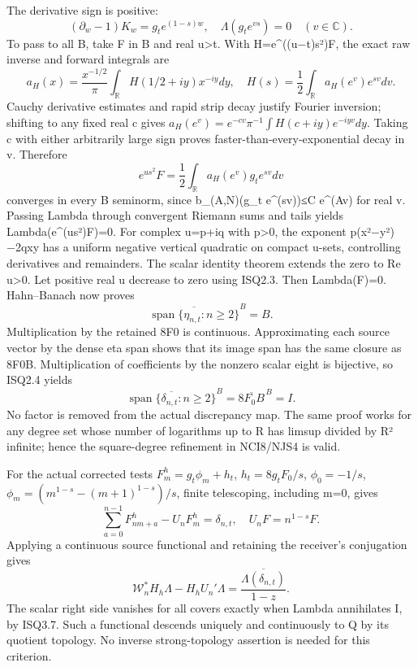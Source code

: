 \documentclass[
]{article}
\begin{document}
The derivative sign is positive: \[
(\partial_w-1)K_w=g_t e^{(1-s)w},
\quad\Lambda(g_t e^{vs})=0\quad(v\in\mathbb C).
\tag{ISQ3.3}
\] To pass to all B, take F in B and real u\textgreater t. With H=e\^{}((u−t)s²)F, the exact raw inverse and forward integrals are \[
a_H(x)=\frac{x^{-1/2}}\pi\int_\mathbb R H(1/2+iy)x^{-iy}dy,
\quad H(s)=\frac12\int_\mathbb R a_H(e^v)e^{sv}dv.
\tag{ISQ3.4}
\] Cauchy derivative estimates and rapid strip decay justify Fourier inversion; shifting to any fixed real c gives \(a_H(e^v)=e^{-cv}\pi^{-1}\int H(c+iy)e^{-iyv}dy\). Taking c with either arbitrarily large sign proves faster-than-every-exponential decay in \textbar v\textbar. Therefore \[
e^{us^2}F=\frac12\int_\mathbb R a_H(e^v)g_t e^{sv}dv
\tag{ISQ3.5}
\] converges in every B seminorm, since b\_(A,N)(g\_t e\^{}(sv))≤C e\^{}(A\textbar v\textbar) for real v. Passing Lambda through convergent Riemann sums and tails yields Lambda(e\^{}(us²)F)=0. For complex u=p+iq with p\textgreater0, the exponent p(x²−y²)−2qxy has a uniform negative vertical quadratic on compact u-sets, controlling derivatives and remainders. The scalar identity theorem extends the zero to Re u\textgreater0. Let positive real u decrease to zero using ISQ2.3. Then Lambda(F)=0. Hahn--Banach now proves \[
\overline{\operatorname{span}\{\eta_{n,t}:n\ge2\}}^B=B.
\tag{ISQ3.6}
\] Multiplication by the retained 8F0 is continuous. Approximating each source vector by the dense eta span shows that its image span has the same closure as 8F0B. Multiplication of coefficients by the nonzero scalar eight is bijective, so ISQ2.4 yields \[
\overline{\operatorname{span}\{\delta_{n,t}:n\ge2\}}^B
=\overline{8F_0B}^{\,B}=I.
\tag{ISQ3.7}
\] No factor is removed from the actual discrepancy map. The same proof works for any degree set whose number of logarithms up to R has limsup divided by R² infinite; hence the square-degree refinement in NCI8/NJS4 is valid.

For the actual corrected tests \(F^h_m=g_t\phi_m+h_t\), \(h_t=8g_tF_0/s\), \(\phi_0=-1/s\), \(\phi_m=(m^{1-s}-(m+1)^{1-s})/s\), finite telescoping, including m=0, gives \[
\sum_{a=0}^{n-1}F^h_{nm+a}-U_nF^h_m=\delta_{n,t},
\quad U_nF=n^{1-s}F.
\] Applying a continuous source functional and retaining the receiver's conjugation gives \[
\mathscr W_n^*H_h\Lambda-H_hU_n'\Lambda
=\frac{\overline{\Lambda(\delta_{n,t})}}{1-z}.
\tag{ISQ3.8}
\] The scalar right side vanishes for all covers exactly when Lambda annihilates I, by ISQ3.7. Such a functional descends uniquely and continuously to Q by its quotient topology. No inverse strong-topology assertion is needed for this criterion.
\end{document}
